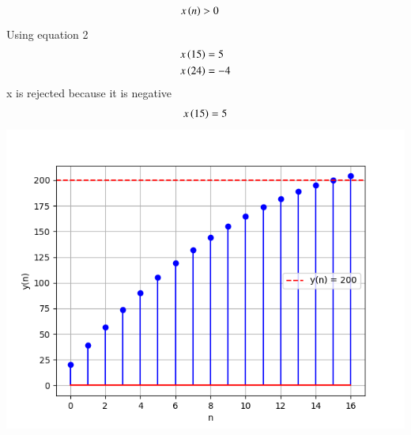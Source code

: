 \documentclass[journal,12pt,twocolumn]{IEEEtran}
\theoremstyle{remark}
\begin{document}
  \begin{align}
 & x\left(n\right)>0\end{align}
Using equation 2
\begin{align} &x\left(15\right)=5\\
 &x\left(24\right)=-4 \end{align}
x is rejected because it is negative
\begin{align}x\left(15\right)=5\end{align}
\includegraphics[width=2\linewidth]{figs/f2.png}\\\\
\end{document}
